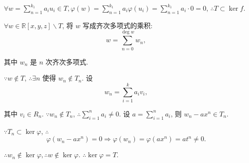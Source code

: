 \documentclass[color=black,device=normal,lang=cn,mode=geye]{elegantnote}
\begin{document}
\begin{solution}
    $\forall w=\sum\limits_{n=1}^{k_1}a_iu_i\in T,\varphi(w)=\sum\limits_{n=1}^{k_1}a_i\varphi(u_i)=\sum\limits_{n=1}^{k_1}a_i\cdot0=0$, $\therefore T\subset\ker f$.

    $\forall w\in\mathbb{R}[x,y,z]\backslash T$, 将 $w$ 写成齐次多项式的乘积:
    \[w=\sum\limits_{n=0}^{\deg w}w_n,\]

    其中 $w_n$ 是 $n$ 次齐次多项式.

    $\because w\notin T$, $\therefore\exists n$ 使得 $w_n\notin T_n$. 设
    \[w_n=\sum\limits_{i=1}^ka_iv_i,\]
    
    其中 $v_i\in R_n$. $\because w_n\notin T_n$, $\therefore\sum\limits_{i=1}^na_i\neq0$. 设 $a=\sum\limits_{i=1}^na_i$, 则 $w_n-ax^n\in T_n$.

    $\because T_n\subset\ker\varphi$, $\therefore$
    \[\varphi(w_n-ax^n)=0\Rightarrow\varphi(w_n)=\varphi(ax^n)=at^n\neq0.\]

    $\therefore w_n\notin\ker\varphi,\therefore w\notin\ker\varphi$. $\therefore\ker\varphi=T$.
\end{solution}
\end{document}
